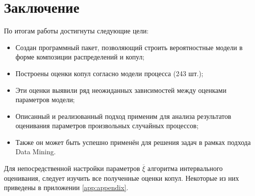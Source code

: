 \chapter*{Заключение}	%

По итогам работы достигнуты следующие цели:
\begin{itemize}
  \item Создан программный пакет, позволяющий строить вероятностные модели в форме композиции распределений и копул;
  \item Построены оценки копул согласно модели процесса (243 шт.);
  \item Эти оценки выявили ряд неожиданных зависимостей между оценками параметров модели;
  \item Описанный и реализованный подход применим для анализа результатов оценивания параметров произвольных случайных процессов;
  \item Также он может быть успешно применён для решения задач в рамках подхода Data Mining.
\end{itemize}

Для непосредственной настройки параметров $\overline{\xi}$ алгоритма интервального оценивания, следует изучить все полученные оценки копул. Некоторые из них приведены в приложении \ref{app:appendix}.

\clearpage
